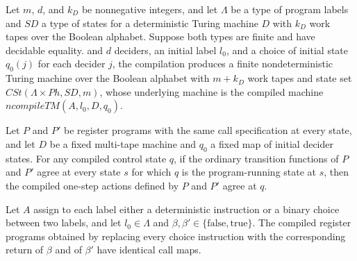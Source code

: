 \begin{definition}
\label{Complexity.LogProg.ncompileFinNDTM}
\leanok
{}
Let $m$, $d$, and $k_D$ be nonnegative integers, and let $\Lambda$ be a type of program
labels and $SD$ a type of states for a deterministic Turing machine $D$ with $k_D$ work
tapes over the Boolean alphabet. Suppose both types are finite and have decidable equality.
and $d$ deciders, an initial label $l_0$, and a choice of initial state $q_0(j)$ for
each decider $j$, the compilation produces a finite nondeterministic Turing machine over
the Boolean alphabet with $m+k_D$ work tapes and state set $CSt(\Lambda \times Ph, SD,
m)$, whose underlying machine is the compiled machine $ncompileTM(A,l_0,D,q_0)$.
\end{definition}

\begin{lemma}
\label{Complexity.LogProg.ctr_congr}
\leanok
{}
Let $P$ and $P'$ be register programs with the same call specification at every state,
and let $D$ be a fixed multi-tape machine and $q_0$ a fixed map of initial decider
states. For any compiled control state $q$, if the ordinary transition functions of $P$
and $P'$ agree at every state $s$ for which $q$ is the program-running state at $s$,
then the compiled one-step actions defined by $P$ and $P'$ agree at $q$.
\end{lemma}

\begin{lemma}
\label{Complexity.LogProg.armProg_detPart_call}
\leanok
{}
Let $A$ assign to each label either a deterministic instruction or a binary choice
between two labels, and let $l_0\in\Lambda$ and
$\beta,\beta'\in\{\mathrm{false},\mathrm{true}\}$. The compiled register programs
obtained by replacing every choice instruction with the corresponding return of $\beta$
and of $\beta'$ have identical call maps.
\end{lemma}

